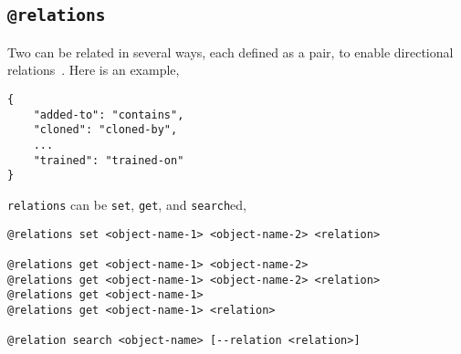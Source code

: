 \subsection{\texttt{@relations}}
\label{relations}

Two  can be related in several ways, each defined as a pair, to enable directional relations~. Here is an example,
%
\begin{verbatim}
{
    "added-to": "contains",
    "cloned": "cloned-by",
    ...
    "trained": "trained-on"
}
\end{verbatim}
%
\texttt{relations} can be \texttt{set}, \texttt{get}, and \texttt{search}ed, 
%
\begin{verbatim}
@relations set <object-name-1> <object-name-2> <relation>

@relations get <object-name-1> <object-name-2>
@relations get <object-name-1> <object-name-2> <relation>
@relations get <object-name-1>
@relations get <object-name-1> <relation>

@relation search <object-name> [--relation <relation>]
\end{verbatim}